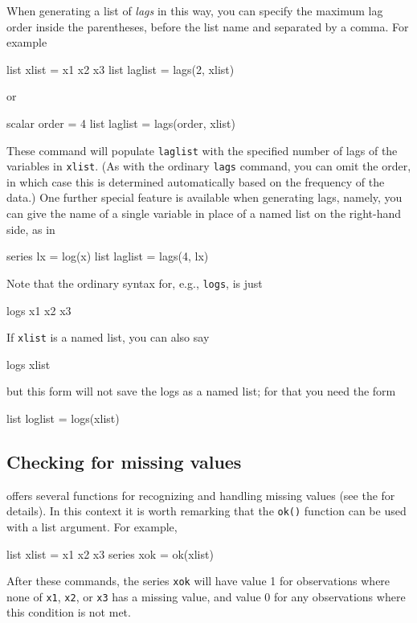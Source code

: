 When generating a list of \textit{lags} in this way, you can specify
the maximum lag order inside the parentheses, before the list name and
separated by a comma.  For example
%
\begin{code}
list xlist = x1 x2 x3
list laglist = lags(2, xlist)
\end{code}
%
or
%
\begin{code}
scalar order = 4
list laglist = lags(order, xlist)
\end{code}

These command will populate \texttt{laglist} with the specified number
of lags of the variables in \texttt{xlist}.  (As with the ordinary
\texttt{lags} command, you can omit the order, in which case this is
determined automatically based on the frequency of the data.)  One
further special feature is available when generating lags, namely, you
can give the name of a single variable in place of a named list on the
right-hand side, as in
%
\begin{code}
series lx = log(x)
list laglist = lags(4, lx)
\end{code}

Note that the ordinary syntax for, e.g., \texttt{logs}, is just
%
\begin{code}
logs x1 x2 x3
\end{code}
%
If \texttt{xlist} is a named list, you can also say
%
\begin{code}
logs xlist
\end{code}
%
but this form will not save the logs as a named list; for that you
need the form
%
\begin{code}
list loglist = logs(xlist)
\end{code}


\subsection{Checking for missing values}

 offers several functions for recognizing and handling
missing values (see the \GCR{} for details). In this context it is
worth remarking that the \texttt{ok()} function can be used with a
list argument.  For example,
%
\begin{code}
list xlist = x1 x2 x3
series xok = ok(xlist)
\end{code}
%
After these commands, the series \texttt{xok} will have value 1 for
observations where none of \texttt{x1}, \texttt{x2}, or
\texttt{x3} has a missing value, and value 0 for any observations
where this condition is not met.


